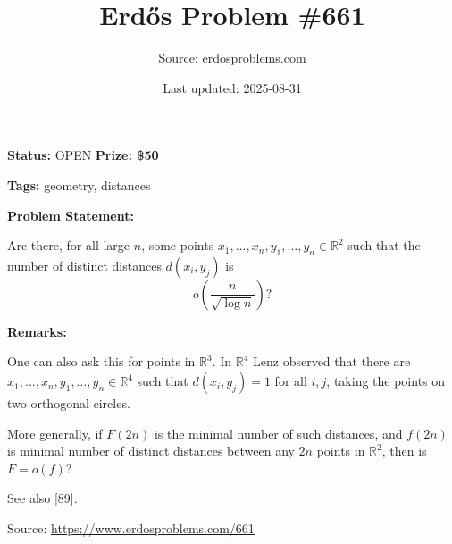 \documentclass{article}
\title{Erd\H{o}s Problem \#661}
\date{Last updated: 2025-08-31}
\author{Source: erdosproblems.com}
\begin{document}
\maketitle

\noindent\textbf{Status:} OPEN \quad \textbf{Prize: \$50}

\noindent\textbf{Tags:} geometry, distances

\medskip
\noindent\textbf{Problem Statement:}

Are there, for all large $n$, some points $x_1,\ldots,x_n,y_1,\ldots,y_n\in \mathbb{R}^2$ such that the number of distinct distances $d(x_i,y_j)$ is\[o\left(\frac{n}{\sqrt{\log n}}\right)?\]

\bigskip
\noindent\textbf{Remarks:}

One can also ask this for points in $\mathbb{R}^3$. In $\mathbb{R}^4$ Lenz observed that there are $x_1,\ldots,x_n,y_1,\ldots,y_n\in \mathbb{R}^4$ such that $d(x_i,y_j)=1$ for all $i,j$, taking the points on two orthogonal circles.

More generally, if $F(2n)$ is the minimal number of such distances, and $f(2n)$ is minimal number of distinct distances between any $2n$ points in $\mathbb{R}^2$, then is $F =o(f)$?

See also [89].

\bigskip
\noindent\small{Source: \url{https://www.erdosproblems.com/661}}
\end{document}
